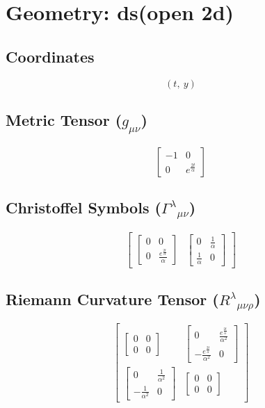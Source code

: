 \documentclass{article}
\begin{document}
\section*{Geometry: ds(open 2d)}
\subsection*{Coordinates}
\[
\left( t, \  y\right)
\]
\vspace{1em}
\subsection*{Metric Tensor ($g_{\mu\nu}$)}
\[
\left[\begin{matrix}-1 & 0\\0 & e^{\frac{2 t}{\alpha}}\end{matrix}\right]
\]
\vspace{1em}
\subsection*{Christoffel Symbols ($\Gamma^{\lambda}{}_{\mu\nu}$)}
\[
\left[\begin{matrix}\left[\begin{matrix}0 & 0\\0 & \frac{e^{\frac{2 t}{\alpha}}}{\alpha}\end{matrix}\right] & \left[\begin{matrix}0 & \frac{1}{\alpha}\\\frac{1}{\alpha} & 0\end{matrix}\right]\end{matrix}\right]
\]
\vspace{1em}
\subsection*{Riemann Curvature Tensor ($R^{\lambda}{}_{\mu\nu\rho}$)}
\[
\left[\begin{matrix}\left[\begin{matrix}0 & 0\\0 & 0\end{matrix}\right] & \left[\begin{matrix}0 & \frac{e^{\frac{2 t}{\alpha}}}{\alpha^{2}}\\- \frac{e^{\frac{2 t}{\alpha}}}{\alpha^{2}} & 0\end{matrix}\right]\\\left[\begin{matrix}0 & \frac{1}{\alpha^{2}}\\- \frac{1}{\alpha^{2}} & 0\end{matrix}\right] & \left[\begin{matrix}0 & 0\\0 & 0\end{matrix}\right]\end{matrix}\right]
\]
\vspace{1em}
\end{document}
